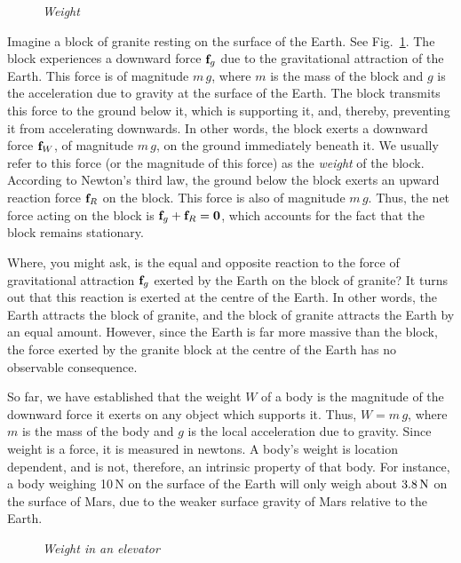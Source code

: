 \begin{figure}
\epsfysize=1.6in
\centerline{}
\caption{\em Weight}\label{f24}   
\end{figure}

Imagine a block of granite resting on the surface of the Earth. 
See Fig.~\ref{f24}. The block experiences
a downward force ${\bf f}_g$ due to the gravitational attraction of the Earth. This
force is of magnitude $m\,g$, where $m$ is the mass of the block and $g$ is the acceleration
due to gravity at the surface of the Earth. The block transmits this force to the
ground below it, which is supporting it, and, thereby, preventing it from accelerating 
downwards.  In other words, the block exerts a downward force ${\bf f}_W$, of magnitude $m\,g$,
on the ground immediately beneath it. We usually refer to this force (or the
magnitude of this force) as the {\em weight} of the block. According to Newton's third
law, the ground below the block exerts an upward reaction force ${\bf f}_R$ on the block.
This force is also of magnitude $m\,g$. Thus, the net force acting on the block
is ${\bf f}_g + {\bf f}_R = {\bf 0}$, which accounts for the fact that the block
remains stationary.

Where, you might ask, is the equal and opposite reaction to the force of gravitational
attraction
${\bf f}_g$ exerted by the Earth on the block of granite? It turns out that
this reaction is exerted at the centre of the Earth. In other words, the Earth attracts the
block of granite, and the block of granite attracts the Earth by an equal amount. However,
since the Earth is far more massive than the block, the force
exerted  by the granite block at the centre of the Earth has no observable consequence.

So far, we have established that the weight $W$ of a body is the magnitude of the downward
force it exerts on any object which supports it.  Thus, $W=m\,g$, where $m$ is the
mass of the body and $g$ is the local acceleration due to gravity. Since weight is a force,
it is measured in newtons. A body's weight is location dependent, and is not, therefore, 
an intrinsic property of that body. For instance, a body weighing 10\,N on the surface of
the Earth will only weigh about $3.8\,{\rm N}$ on the surface of Mars, due to the
weaker surface gravity of Mars relative to the Earth.

\begin{figure}
\epsfysize=3in
\centerline{}
\caption{\em Weight in an elevator}\label{f25}   
\end{figure}

